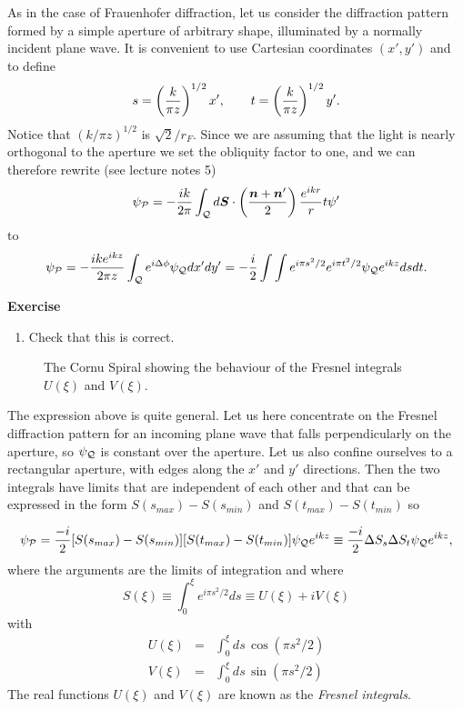 \documentclass{article}
\newcommand{\be}{\begin{equation}}
\newcommand{\ee}{\end{equation}}
\newcommand{\bua}{\begin{eqnarray*}}
\newcommand{\eua}{\end{eqnarray*}}
\def\cl#1{{\cal #1}}               %
\begin{document}
As in the case of Frauenhofer diffraction, let us consider the diffraction pattern formed 
by a simple aperture of arbitrary shape, illuminated by a normally incident
plane wave. It is convenient to use Cartesian coordinates $(x',y')$ and to 
define
\[
s=\left({k\over\pi z}\right)^{1/2}x',\qquad t=\left({k\over\pi z}\right)^{1/2}y'.
\]
\noindent
Notice that $(k/\pi z)^{1/2}$ is $\sqrt{2}/r_{F}$. Since we are assuming that the light is
nearly  orthogonal to the aperture we set the obliquity factor to one, and we can therefore rewrite (see lecture notes 5)
\[
\psi_\cl{P}=-{ik\over 2\pi}\int_\cl{Q}d{\bm S}\cdot\left({{\bm n}+{\bm n'}\over 2}\right){e^{ikr}\over r}t\psi'
\label{eq:small-aperture}
\]
to
\[
\psi_{\cal P}=-{ike^{ikz}\over 2\pi z}\int_{\cal Q}e^{i\Delta\phi}\psi_{\cal Q}dx'dy'
=-{i\over 2}\int\int e^{i\pi s^2/2}e^{i\pi t^2/2}\psi_{\cal Q}e^{ikz}dsdt.
\]

{\bf Exercise}

\begin{enumerate}
\setcounter{enumi}{\value{count}}
\item Check that this is correct. 
\setcounter{count}{\value{enumi}}
\end{enumerate}

\begin{figure}[th!]
  \hfil{}\hfil
  \caption{The Cornu Spiral showing the behaviour of the Fresnel integrals
$U(\xi)$ and $V(\xi)$. }
  \label{fig:cornu}
\end{figure}

The expression above is quite general. Let us here concentrate on the 
Fresnel diffraction pattern for an incoming plane wave that falls 
perpendicularly on the aperture, so $\psi_{\cal Q}$ is constant over the
aperture. Let us also confine ourselves to a rectangular aperture, with edges
along the $x'$ and $y'$ directions. Then the two integrals have limits that 
are independent of each other and that can be expressed in the form
$S(s_{max})-S(s_{min})$ and $S(t_{max})-S(t_{min})$ so

\be
\psi_{\cal P}={-i\over 2}[S(s_{max})-S(s_{min})][S(t_{max})-S(t_{min})]\psi_{\cal Q}e^{ikz}\equiv{-i\over 2}\Delta S_s\Delta S_t\psi_{\cal Q}e^{ikz},
\label{eq:fresnel}
\ee
where the arguments are the limits of integration and where
\[
S(\xi)\equiv\int_0^\xi e^{i\pi s^2/2}ds\equiv U(\xi)+iV(\xi)
\]
with
\bua
U(\xi)&=&\int_0^\xi ds\,\cos({\pi s^2/2}) \\
V(\xi)&=&\int_0^\xi ds\,\sin({\pi s^2/2})
\eua
\noindent
The real functions $U(\xi)$ and $V(\xi)$ are known as the {\it Fresnel integrals}.
\end{document}
